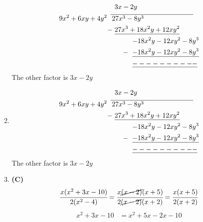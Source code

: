 \begin{multicols}{2}
\begin{enumerate}[label={\textbf{\arabic*.}}]
\begin{align*}
    &\hspace{6pt} 3x - 2y \\
        9x^2 + 6xy + 4y^2 \hspace{5pt}  & \overline{\hspace{2pt} 27x^3 - 8y^3 \hspace{1in}} \\
      -\hspace{-3pt} & \hspace{6pt} \underline{27x^3 + 18x^2y + 12xy^2} \\
      & \hspace{32pt} {-18x^2y - 12xy^2 - 8y^3} \\
     -\hspace{-26pt} & \hspace{32pt} \underline{-18x^2y - 12xy^2 -8y^3}\\
     & \hspace{32pt} \underline{----------}
    \end{align*}
    The other factor is \(3x - 2y\)
\item 
    \begin{align*}
    &\hspace{6pt} 3x - 2y \\
        9x^2 + 6xy + 4y^2 \hspace{5pt}  & \overline{\hspace{2pt} 27x^3 - 8y^3 \hspace{1in}} \\
      -\hspace{-3pt} & \hspace{6pt} \underline{27x^3 + 18x^2y + 12xy^2} \\
      & \hspace{32pt} {-18x^2y - 12xy^2 - 8y^3} \\
     -\hspace{-26pt} & \hspace{32pt} \underline{-18x^2y - 12xy^2 -8y^3}\\
     & \hspace{32pt} \underline{----------}
    \end{align*}
    The other factor is $3x - 2y$
\item \textbf{(C)} \\
    \[\cfrac{x(x^2 + 3x - 10)}{2(x^2 - 4)} = \cfrac{x\cancel{(x-2)}(x+5)}{2\cancel{(x-2)}(x+2)} = \cfrac{x(x+5)}{2(x+2)}\]
        \begin{align*}
        x^2 + 3x - 10 &= x^2 + 5x - 2x - 10 \\ 

\end{align*}
\end{enumerate}
\end{multicols}
